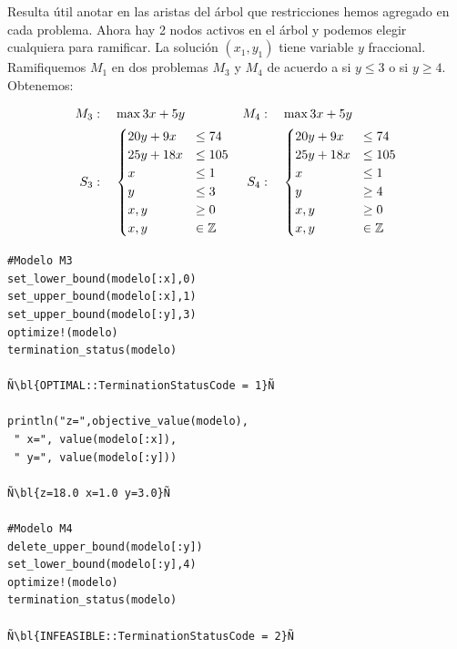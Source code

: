     \medskip
    
    Resulta útil anotar en las aristas del árbol que restricciones hemos agregado en cada problema. Ahora hay 2 nodos activos en el árbol y podemos elegir cualquiera para ramificar. La solución $(x_1,y_1)$ tiene variable $y$ fraccional. Ramifiquemos $M_1$ en dos problemas $M_3$ y $M_4$ de acuerdo a si $y\leq 3$ o si $y\geq 4$. Obtenemos:
    
    \NAM{\begin{center}}{}
    \begin{minipage}{0.4\textwidth}
    	\begin{align*}
    	M_3&:\quad 	\max 3x+5y & M_4&:\quad 	\max 3x+5y\\ 
    	S_3&:\quad \begin{cases}
    	20y+9x&\leq 74\\
    	25y+18x&\leq 105\\
    	x&\leq 1\\
    	y&\leq 3\\
    	x,y&\geq 0\\
    	x,y&\in \mathbb Z\end{cases}&S_4&:\quad \begin{cases}
    	20y+9x&\leq 74\\
    	25y+18x&\leq 105\\
    	x&\leq 1\\
    	y&\geq 4\\
    	x,y&\geq 0\\
    	x,y&\in \mathbb Z\end{cases}
    	\end{align*}
    \end{minipage}
    \NAM{\end{center}}{}
    \begin{lstlisting}[escapechar=Ñ]
#Modelo M3
set_lower_bound(modelo[:x],0)
set_upper_bound(modelo[:x],1) 
set_upper_bound(modelo[:y],3) 
optimize!(modelo)
termination_status(modelo)

Ñ\bl{OPTIMAL::TerminationStatusCode = 1}Ñ

println("z=",objective_value(modelo),
 " x=", value(modelo[:x]),
 " y=", value(modelo[:y]))

Ñ\bl{z=18.0 x=1.0 y=3.0}Ñ

#Modelo M4
delete_upper_bound(modelo[:y])
set_lower_bound(modelo[:y],4) 
optimize!(modelo)
termination_status(modelo)

Ñ\bl{INFEASIBLE::TerminationStatusCode = 2}Ñ
    \end{lstlisting}
    \NAM{
    \end{minipage}
    \end{center}
    }{
    \end{minipage}
    }
    
